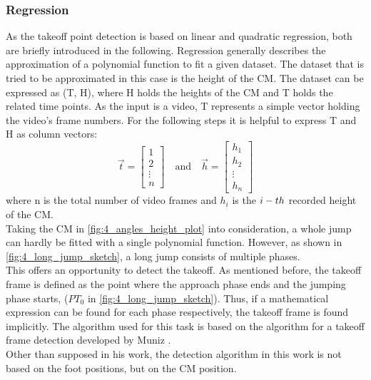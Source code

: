 \subsubsection{Regression}
As the takeoff point detection is based on linear and quadratic regression,
both are briefly introduced in the following.
Regression generally describes the approximation of a polynomial function to
fit a given dataset.
The dataset that is tried to be approximated in this case is the height of the
\ac{CM}.
The dataset can be expressed as (T, H), where H holds the heights of the
\ac{CM} and T holds the related time points.
As the input is a video, T represents a simple vector holding the
video's frame numbers.
For the following steps it is helpful to express T and H as column vectors:
\begin{equation}
    \vec{t} = \begin{bmatrix}
        1\\
        2\\
        \vdots\\
        n
    \end{bmatrix}
        \quad\text{and}\quad
    \vec{h} = \begin{bmatrix}
        h_1\\
        h_2\\
        \vdots\\
        h_n
    \end{bmatrix}
\end{equation}
where n is the total number of video frames and $h_i$ is the $i\--th$ recorded
height of the \ac{CM}.\\
Taking the \ac{CM} in \autoref{fig:4_angles_height_plot} into consideration,
a whole jump can hardly be fitted with a single polynomial function.
However, as shown in \autoref{fig:4_long_jump_sketch}, a long jump consists of
multiple phases.\\
This offers an opportunity to detect the takeoff.
As mentioned before, the takeoff frame is defined as the point where the
approach phase ends and the jumping phase starts, ($PT_0$ in
\autoref{fig:4_long_jump_sketch}).
Thus, if a mathematical expression can be found for each phase respectively,
the takeoff frame is found implicitly.
The algorithm used for this task is based on the algorithm for a takeoff
frame detection developed by Muniz \cite{muniz_detection_2019}.\\
Other than supposed in his work, the detection algorithm in this work is not
based on the foot positions, but on the \ac{CM} position.
